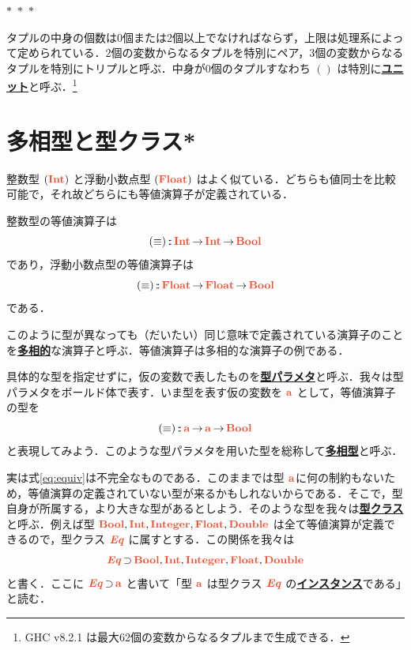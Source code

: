 \documentclass[a5paper,twoside,fleqn,draft]{jsbook}
\def\typeColor{RedOrange}
\newcommand{\separator}{\begin{center}$*$~$*$~$*$\end{center}}
\newcommand{\keyword}[1]{{\underline{\textbf{#1}}}}
\DeclareMathOperator{\mSuperSet}{\supset}
\DeclareMathOperator{\mFuncArrow}{\rightarrow}
\DeclareMathOperator{\mIn}{{:\!:}}
\newcommand{\mType}[1]{\textcolor{\typeColor}{\mathbf{#1}}}
\newcommand{\mA}{\mType{a}}
\newcommand{\mBoolType}{\mType{Bool}}
\newcommand{\mFloatType}{\mType{Float}}
\newcommand{\mDoubleType}{\mType{Double}}
\newcommand{\mIntType}{\mType{Int}}
\newcommand{\mIntegerType}{\mType{Integer}}
\newcommand{\mTypeClass}[1]{\textcolor{\typeColor}{\textbf{\textit{#1}}}}
\newcommand{\mEqTypeClass}{\mTypeClass{Eq}}
\begin{document}
\separator

タプルの中身の個数は0個または2個以上でなければならず，上限は処理系によって定められている．2個の変数からなるタプルを特別にペア，3個の変数からなるタプルを特別にトリプルと呼ぶ．中身が0個のタプルすなわち $()$ は特別に\keyword{ユニット}と呼ぶ．\footnote{GHC v8.2.1 は最大62個の変数からなるタプルまで生成できる．}

\section{多相型と型クラス*}

整数型 $(\mIntType)$ と浮動小数点型 $(\mFloatType)$ はよく似ている．どちらも値同士を比較可能で，それ故どちらにも等値演算子が定義されている．

整数型の等値演算子は
\begin{equation}
  (\equiv)
  \mIn\mIntType\mFuncArrow\mIntType\mFuncArrow\mBoolType
\end{equation}
であり，浮動小数点型の等値演算子は
\begin{equation}
  (\equiv)
  \mIn\mFloatType\mFuncArrow\mFloatType\mFuncArrow\mBoolType
\end{equation}
である．

このように型が異なっても（だいたい）同じ意味で定義されている演算子のことを\keyword{多相的}な演算子と呼ぶ．等値演算子は多相的な演算子の例である．

具体的な型を指定せずに，仮の変数で表したものを\keyword{型パラメタ}と呼ぶ．我々は型パラメタをボールド体で表す．いま型を表す仮の変数を $\mA $ として，等値演算子の型を
\begin{equation}
  \label{eq:equiv}
  (\equiv)
  \mIn\mA\mFuncArrow\mA\mFuncArrow\mBoolType
\end{equation}
と表現してみよう．このような型パラメタを用いた型を総称して\keyword{多相型}と呼ぶ．

実は式\eqref{eq:equiv}は不完全なものである．このままでは型 $\mA $に何の制約もないため，等値演算の定義されていない型が来るかもしれないからである．そこで，型自身が所属する，より大きな型があるとしよう．そのような型を我々は\keyword{型クラス}と呼ぶ．例えば型 $\mBoolType,\mIntType,\mIntegerType,\mFloatType,\mDoubleType$ は全て等値演算が定義できるので，型クラス $\mEqTypeClass$ に属すとする．この関係を我々は
\begin{equation}
  \mEqTypeClass
  \mSuperSet\mBoolType,\mIntType,\mIntegerType,\mFloatType,\mDoubleType
\end{equation}
と書く．ここに $\mEqTypeClass\mSuperSet\mA$ と書いて「型 $\mA$ は型クラス $\mEqTypeClass$ の\keyword{インスタンス}である」と読む．
\end{document}
